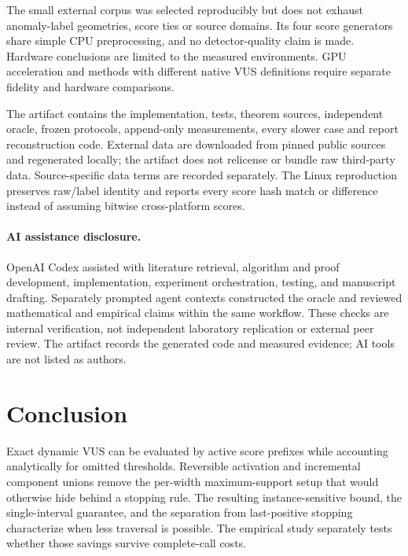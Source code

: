 The small external corpus was selected reproducibly but does not exhaust
anomaly-label geometries, score ties or source domains. Its four score
generators share simple CPU preprocessing, and no detector-quality claim is
made. Hardware conclusions are limited to the measured environments. GPU
acceleration and methods with different native VUS definitions require
separate fidelity and hardware comparisons.

The artifact contains the implementation, tests, theorem sources, independent
oracle, frozen protocols, append-only measurements, every slower case and
report reconstruction code. External data are downloaded from pinned public
sources and regenerated locally; the artifact does not relicense or bundle
raw third-party data. Source-specific data terms are recorded separately.
The Linux reproduction preserves raw/label identity and reports every score
hash match or difference instead of assuming bitwise cross-platform scores.

\paragraph{AI assistance disclosure.}
OpenAI Codex assisted with literature retrieval, algorithm and proof
development, implementation, experiment orchestration, testing, and manuscript
drafting. Separately prompted agent contexts constructed the oracle and
reviewed mathematical and empirical claims within the same workflow. These
checks are internal verification, not independent laboratory replication or
external peer review. The artifact records the generated code and measured
evidence; AI tools are not listed as authors.

\section{Conclusion}
Exact dynamic VUS can be evaluated by active score prefixes while accounting
analytically for omitted thresholds. Reversible activation and incremental
component unions remove the per-width maximum-support setup that would
otherwise hide behind a stopping rule. The resulting instance-sensitive bound,
the single-interval guarantee, and the separation from last-positive stopping
characterize when less traversal is possible. The empirical study separately
tests whether those savings survive complete-call costs.
